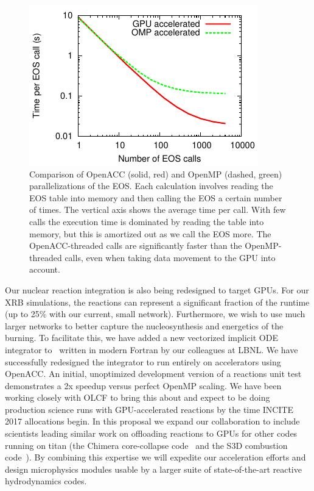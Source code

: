 \begin{figure}[t]
  \centering
  \includegraphics[width=0.5\linewidth]{eos_openacc.pdf}
  \begin{minipage}[b]{0.45\linewidth}
  \caption{Comparison of OpenACC (solid, red) and OpenMP (dashed,
    green) parallelizations of the EOS. Each calculation involves
    reading the EOS table into memory and then calling the EOS a
    certain number of times. The vertical axis shows the average time
    per call.  With few calls the execution time is dominated by
    reading the table into memory, but this is amortized out as we
    call the EOS more.  The OpenACC-threaded calls are significantly faster
    than the OpenMP-threaded calls, even when taking data movement to
    the GPU into account.\label{fig-eos-openacc}}
   \end{minipage}
\end{figure}

Our nuclear reaction integration is also being redesigned to target
GPUs.  For our XRB simulations, the reactions can represent a
significant fraction of the runtime (up to 25\% with our current,
small network).  Furthermore, we wish to use much larger networks to
better capture the nucleosynthesis and energetics of the burning.  To
facilitate this, we have added a new vectorized implicit ODE integrator to
\maestro\ written in modern Fortran
by our colleagues at LBNL.  We have successfully redesigned the integrator
to run entirely on accelerators using OpenACC.  An initial, unoptimized 
development version of a reactions unit test demonstrates a 2x speedup versus
perfect OpenMP scaling.  We have been working closely with OLCF to bring this
about and expect to be doing production science runs with GPU-accelerated
reactions by the time INCITE 2017 allocations begin.  
In this proposal we expand
our collaboration to include scientists leading similar work on
offloading reactions to GPUs for other codes running
on titan (the Chimera core-collapse code~\cite{chimera-gpu} and the
S3D combustion code~\cite{s3d}).  By combining this expertise we will expedite
our acceleration efforts and design microphysics modules usable by a larger
suite of state-of-the-art reactive hydrodynamics codes. 

